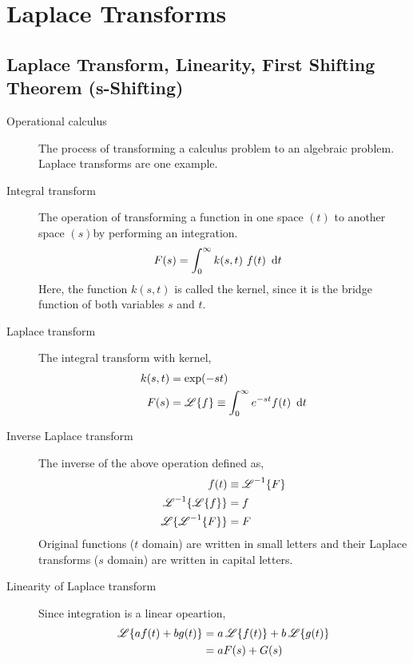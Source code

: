 \chapter{Laplace Transforms}
\section{Laplace Transform, Linearity, First Shifting Theorem (s-Shifting)}
\begin{description}
    \item[Operational calculus] The process of transforming a calculus problem to an
        algebraic problem. Laplace transforms are one example.
    \item[Integral transform] The operation of transforming a function in one space
        $ (t) $ to another space $ (s) $by performing an integration.
        \begin{align}
            F(s) & = \infint k(s, t)\ f(t)\ \dl t
        \end{align}
        Here, the function $ k(s, t) $ is called the kernel, since it is the bridge
        function of both variables $ s $ and $ t $.
    \item[Laplace transform] The integral transform with kernel,
        \begin{align}
            k(s, t) & = \exp(-st)                                   \\
            F(s)    & = \Lap\{f\} \equiv \infint e^{-st}f(t)\ \dl t
        \end{align}
    \item[Inverse Laplace transform] The inverse of the above operation defined as,
        \begin{align}
            f(t)                   & \equiv \operatorname{\mathscr{L}}^{-1}\{F\} \\
            \operatorname{\mathscr{L}}^{-1}\{\operatorname{\mathscr{L}}\{f\}\} & = f                   \\
            \operatorname{\mathscr{L}}\{\operatorname{\mathscr{L}}^{-1}\{F\}\} & = F
        \end{align}
        Original functions ($ t $ domain) are written in small letters and their
        Laplace transforms ($ s $ domain) are written in capital letters.
    \item[Linearity of Laplace transform] Since integration is a linear opeartion,
        \begin{align}
            \Lap\{af(t) + bg(t)\} & = a\Lap\{f(t)\}
            + b\Lap\{g(t)\}                         \\
                                  & = aF(s) + G(s)

\end{align}
\end{description}
